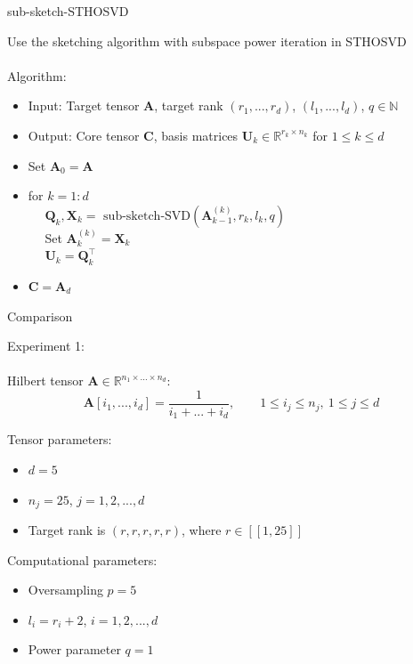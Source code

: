 \documentclass{beamer}
\newcommand{\bvec}[1]{\mathbf{#1}}
\newcommand{\vA}{\bvec{A}}
\newcommand{\vC}{\bvec{C}}
\newcommand{\vQ}{\bvec{Q}}
\newcommand{\vU}{\bvec{U}}
\newcommand{\vX}{\bvec{X}}
\newcommand{\bitem}{\item[$\bullet$]}
\begin{document}
\begin{frame}{sub-sketch-STHOSVD}

Use the sketching algorithm with subspace power iteration in STHOSVD\\
~\\
Algorithm:

\begin{itemize}
    \item[] Input: Target tensor $\vA$, target rank $(r_1,...,r_d)$, $(l_1,...,l_d)$, $q\in\mathbb{N}$
    \item[] Output: Core tensor $\vC$, basis matrices $\vU_k\in \mathbb{R}^{r_k\times n_k}$ for $1\leq k \leq d$
    \item[] Set $\vA_0 = \vA$
    \item[] for $k=1:d$\\
    $\quad $  $\vQ_k, \vX_k = \text{ sub-sketch-SVD}(\vA_{k-1}^{(k)},  r_k, l_k, q)$\\
    $\quad $ Set $\vA_k^{(k)} = \vX_k$\\
    $\quad $ $\vU_k = \vQ_k^\top $
    \item[] $\vC = \vA_d$
\end{itemize}

\end{frame}

\begin{frame}{Comparison}

Experiment 1:\\
~\\
Hilbert tensor $\vA\in\mathbb{R}^{n_1\times ... \times n_d}$:
$$
\vA [i_1,...,i_d]
=
\frac{1}{i_1+...+i_d},
\qquad 
1\leq i_j \leq n_j,~1\leq j \leq d
$$

Tensor parameters:
\begin{itemize}
\bitem $d = 5$  \vspace{-1.5mm}
\bitem $n_j = 25$, $j = 1, 2, . . . , d$ \vspace{-1.5mm}
\bitem Target rank is $(r, r, r, r, r)$, where $r \in [\![1, 25]\!]$
\end{itemize}

Computational parameters:
\begin{itemize}
\bitem Oversampling $p = 5$  \vspace{-1.5mm}
\bitem $l_i = r_i+2$, $i= 1, 2, . . . , d$ \vspace{-1.5mm}
\bitem Power parameter $q=1$
\end{itemize}
\end{frame}
\end{document}
